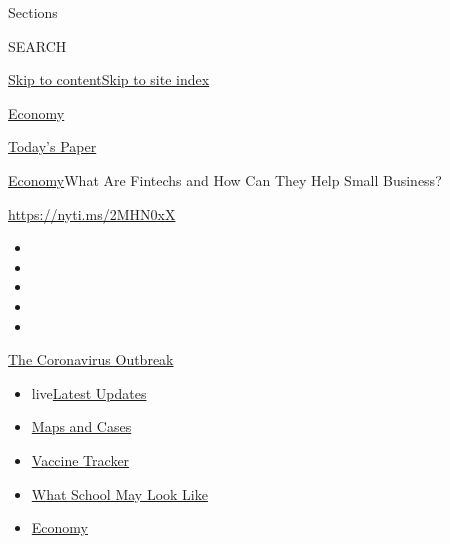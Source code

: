Sections

SEARCH

\protect\hyperlink{site-content}{Skip to
content}\protect\hyperlink{site-index}{Skip to site index}

\href{https://www.nytimes3xbfgragh.onion/section/business/economy}{Economy}

\href{https://myaccount.nytimes3xbfgragh.onion/auth/login?response_type=cookie\&client_id=vi}{}

\href{https://www.nytimes3xbfgragh.onion/section/todayspaper}{Today's
Paper}

\href{/section/business/economy}{Economy}\textbar{}What Are Fintechs and
How Can They Help Small Business?

\href{https://nyti.ms/2MHN0xX}{https://nyti.ms/2MHN0xX}

\begin{itemize}
\item
\item
\item
\item
\item
\end{itemize}

\href{https://www.nytimes3xbfgragh.onion/news-event/coronavirus?action=click\&pgtype=Article\&state=default\&region=TOP_BANNER\&context=storylines_menu}{The
Coronavirus Outbreak}

\begin{itemize}
\tightlist
\item
  live\href{https://www.nytimes3xbfgragh.onion/2020/08/01/world/coronavirus-covid-19.html?action=click\&pgtype=Article\&state=default\&region=TOP_BANNER\&context=storylines_menu}{Latest
  Updates}
\item
  \href{https://www.nytimes3xbfgragh.onion/interactive/2020/us/coronavirus-us-cases.html?action=click\&pgtype=Article\&state=default\&region=TOP_BANNER\&context=storylines_menu}{Maps
  and Cases}
\item
  \href{https://www.nytimes3xbfgragh.onion/interactive/2020/science/coronavirus-vaccine-tracker.html?action=click\&pgtype=Article\&state=default\&region=TOP_BANNER\&context=storylines_menu}{Vaccine
  Tracker}
\item
  \href{https://www.nytimes3xbfgragh.onion/interactive/2020/07/29/us/schools-reopening-coronavirus.html?action=click\&pgtype=Article\&state=default\&region=TOP_BANNER\&context=storylines_menu}{What
  School May Look Like}
\item
  \href{https://www.nytimes3xbfgragh.onion/live/2020/07/31/business/stock-market-today-coronavirus?action=click\&pgtype=Article\&state=default\&region=TOP_BANNER\&context=storylines_menu}{Economy}
\end{itemize}

